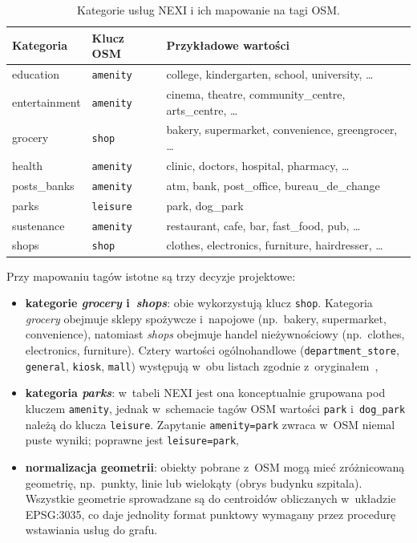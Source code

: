 \begin{table}[ht]
\centering
\caption{Kategorie usług NEXI i ich mapowanie na tagi OSM.}
\label{tab:nexi_tags}
\begin{tabular}{l l p{7.5cm}}
\hline
\textbf{Kategoria} & \textbf{Klucz OSM} & \textbf{Przykładowe wartości} \\
\hline
education      & \texttt{amenity}  & college, kindergarten, school, university, \ldots \\
entertainment  & \texttt{amenity}  & cinema, theatre, community\_centre, arts\_centre, \ldots \\
grocery        & \texttt{shop}     & bakery, supermarket, convenience, greengrocer, \ldots \\
health         & \texttt{amenity}  & clinic, doctors, hospital, pharmacy, \ldots \\
posts\_banks   & \texttt{amenity}  & atm, bank, post\_office, bureau\_de\_change \\
parks          & \texttt{leisure}  & park, dog\_park \\
sustenance     & \texttt{amenity}  & restaurant, cafe, bar, fast\_food, pub, \ldots \\
shops          & \texttt{shop}     & clothes, electronics, furniture, hairdresser, \ldots \\
\hline
\end{tabular}
\end{table}

Przy mapowaniu tagów istotne są trzy decyzje projektowe:
\begin{itemize}
  \item \textbf{kategorie \emph{grocery} i~\emph{shops}}: obie wykorzystują klucz \texttt{shop}.
        Kategoria \emph{grocery} obejmuje sklepy spożywcze i~napojowe
        (np.\ bakery, supermarket, convenience), natomiast \emph{shops} obejmuje handel
        nieżywnościowy (np.\ clothes, electronics, furniture).
        Cztery wartości ogólnohandlowe (\texttt{department\_store}, \texttt{general},
        \texttt{kiosk}, \texttt{mall}) występują w~obu listach zgodnie z~oryginałem~\cite{olivari2023presenting},

  \item \textbf{kategoria \emph{parks}}: w~tabeli NEXI jest ona konceptualnie grupowana
        pod kluczem \texttt{amenity}, jednak w~schemacie tagów OSM wartości \texttt{park}
        i~\texttt{dog\_park} należą do klucza \texttt{leisure}. Zapytanie \texttt{amenity=park}
        zwraca w~OSM niemal puste wyniki; poprawne jest \texttt{leisure=park},

  \item \textbf{normalizacja geometrii}: obiekty pobrane z~OSM mogą mieć zróżnicowaną geometrię,
        np.\ punkty, linie lub wielokąty (obrys budynku szpitala).
        Wszystkie geometrie sprowadzane są do centroidów obliczanych w~układzie EPSG:3035,
        co daje jednolity format punktowy wymagany przez procedurę wstawiania usług do grafu.
\end{itemize}


